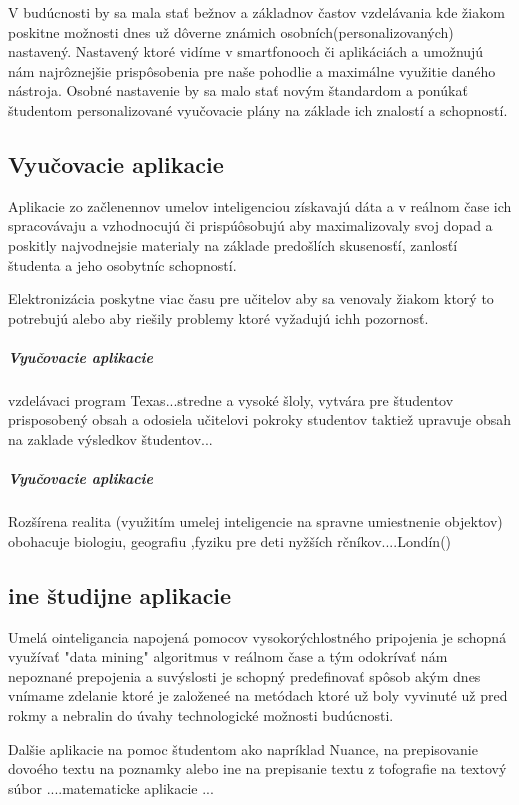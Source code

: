 \documentclass[10pt,oneside,slovak,a4paper]{article}
\begin{document}
V budúcnosti by sa mala stať bežnov a základnov častov vzdelávania kde žiakom poskitne možnosti dnes už dôverne známich osobních(personalizovaných) nastavený. Nastavený ktoré vidíme v smartfonooch či aplikáciách a umožnujú nám najrôznejšie prispôsobenia pre naše pohodlie a maximálne využitie daného nástroja. Osobné nastavenie by sa malo stať novým štandardom a ponúkať študentom personalizované vyučovacie plány na základe ich znalostí a schopností.

\subsection{Vyučovacie aplikacie}

Aplikacie zo začlenennov umelov inteligenciou získavajú dáta a v reálnom čase ich spracovávaju a vzhodnocujú či prispúôsobujú aby maximalizovaly svoj dopad a poskitly najvodnejsie materialy na základe predošlích skusenosťí, zanlosťí študenta a jeho osobytníc schopností.

Elektronizácia poskytne viac času pre učitelov aby sa venovaly žiakom ktorý to potrebujú alebo aby riešily problemy ktoré vyžadujú ichh pozornosť.  

\subparagraph{Vyučovacie aplikacie}
vzdelávaci program Texas...stredne a vysoké šloly, vytvára pre študentov prisposobený obsah a odosiela učitelovi pokroky studentov taktiež upravuje obsah na zaklade výsledkov študentov...



\subparagraph{Vyučovacie aplikacie}

Rozšírena realita  (využitím umelej inteligencie na spravne umiestnenie objektov) obohacuje biologiu, geografiu ,fyziku pre deti nyžších rčníkov....Londín()
\cite{AI}
\subsection{ine študijne aplikacie}
Umelá ointeligancia napojená pomocov vysokorýchlostného pripojenia je schopná využívať "data mining" algoritmus v reálnom čase a tým odokrívať nám nepoznané prepojenia a suvýslosti je schopný predefinovať spôsob akým dnes vnímame zdelanie ktoré je založeneé na metódach ktoré už boly vyvinuté už pred rokmy a nebralin  do úvahy technologické možnosti budúcnosti.


Dalšie aplikacie na pomoc študentom ako napríklad Nuance, na prepisovanie dovoého textu na poznamky alebo ine na prepisanie textu z tofografie na textový súbor ....matematicke aplikacie ...
\end{document}
